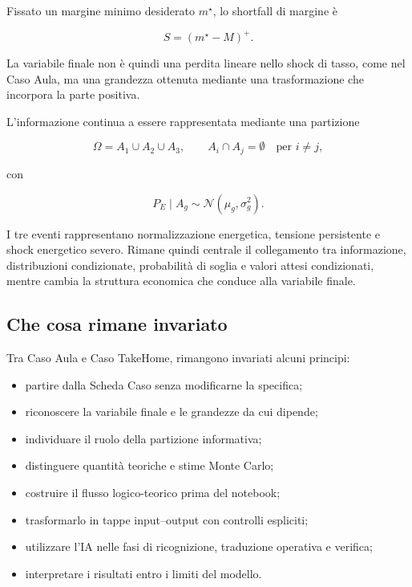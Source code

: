 Fissato un margine minimo desiderato $m^\star$, lo shortfall di margine \`{e}

\[
S=(m^\star-M)^+.
\]

La variabile finale non \`{e} quindi una perdita lineare nello shock di tasso,
come nel Caso Aula, ma una grandezza ottenuta mediante una trasformazione che
incorpora la parte positiva.

L'informazione continua a essere rappresentata mediante una partizione

\[
\Omega=A_1\cup A_2\cup A_3,
\qquad
A_i\cap A_j=\emptyset
\quad\text{per }i\neq j,
\]

\noindent con

\[
P_E\mid A_g
\sim
\mathcal{N}(\mu_g,\sigma_g^2).
\]

I tre eventi rappresentano normalizzazione energetica, tensione persistente e
shock energetico severo. Rimane quindi centrale il collegamento tra
informazione, distribuzioni condizionate, probabilit\`{a} di soglia e valori
attesi condizionati, mentre cambia la struttura economica che conduce alla
variabile finale.

\subsection{Che cosa rimane invariato}

Tra Caso Aula e Caso TakeHome, rimangono invariati alcuni principi:

\begin{itemize}
\item partire dalla Scheda Caso senza modificarne la specifica;

\item riconoscere la variabile finale e le grandezze da cui dipende;

\item individuare il ruolo della partizione informativa;

\item distinguere quantit\`{a} teoriche e stime Monte Carlo;

\item costruire il flusso logico-teorico prima del notebook;

\item trasformarlo in tappe input--output con controlli espliciti;

\item utilizzare l'IA nelle fasi di ricognizione, traduzione operativa e
verifica;

\item interpretare i risultati entro i limiti del modello.
\end{itemize}

